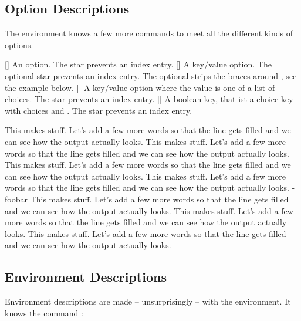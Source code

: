 \documentclass[load-preamble]{cnltx-doc}
\begin{document}
\subsection{Option Descriptions}\label{sec:usage:options}
The  environment knows a few more commands to meet all the
different kinds of options.
\begin{commands}
  [\sarg]
    An option.  The star prevents an index entry.
  [\sarg\code{-}]
    A key/value option.  The optional star prevents an index entry.  The
    optional \code{-} strips the braces around , see the example
    below.
  [\sarg{}]
    A key/value option where the value is one of a list of choices.  The star
    prevents an index entry.
  [\sarg{}]
    A boolean key, that ist a choice key with choices  and 
    .  The star prevents an index entry.
\end{commands}

\begin{example}
  \begin{options}
      This makes stuff.  Let's add a few more words so that the line gets
      filled and we can see how the output actually looks.
      This makes stuff.  Let's add a few more words so that the line gets
      filled and we can see how the output actually looks.
    \Default
      This makes stuff.  Let's add a few more words so that the line gets
      filled and we can see how the output actually looks.
      This makes stuff.  Let's add a few more words so that the line gets
      filled and we can see how the output actually looks.
    \keyval-{foo}{bar}
      This makes stuff.  Let's add a few more words so that the line gets
      filled and we can see how the output actually looks.
      This makes stuff.  Let's add a few more words so that the line gets
      filled and we can see how the output actually looks.
      This makes stuff.  Let's add a few more words so that the line gets
      filled and we can see how the output actually looks.
  \end{options}
\end{example}

\subsection{Environment Descriptions}\label{sec:usage:environments}
Environment descriptions are made -- unsurprisingly -- with the
 environment.  It knows the command :
\end{document}
